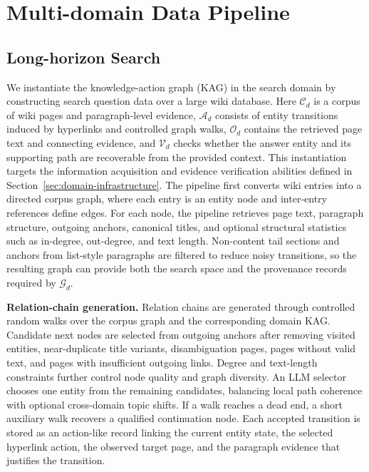 \documentclass{llmxive}
\begin{document}
\section{Multi-domain Data Pipeline}
\subsection{Long-horizon Search}
\label{sec:search_data}
We instantiate the knowledge-action graph (KAG) in the search domain by constructing search question data over a large wiki database. Here $\mathcal{C}_d$ is a corpus of wiki pages and paragraph-level evidence, $\mathcal{A}_d$ consists of entity transitions induced by hyperlinks and controlled graph walks, $\mathcal{O}_d$ contains the retrieved page text and connecting evidence, and $\mathcal{V}_d$ checks whether the answer entity and its supporting path are recoverable from the provided context. This instantiation targets the information acquisition and evidence verification abilities defined in Section~\ref{sec:domain-infrastructure}. The pipeline first converts wiki entries into a directed corpus graph, where each entry is an entity node and inter-entry references define edges. For each node, the pipeline retrieves page text, paragraph structure, outgoing anchors, canonical titles, and optional structural statistics such as in-degree, out-degree, and text length. Non-content tail sections and anchors from list-style paragraphs are filtered to reduce noisy transitions, so the resulting graph can provide both the search space and the provenance records required by $\mathcal{G}_d$.

\textbf{Relation-chain generation.} Relation chains are generated through controlled random walks over the corpus graph and the corresponding domain KAG. Candidate next nodes are selected from outgoing anchors after removing visited entities, near-duplicate title variants, disambiguation pages, pages without valid text, and pages with insufficient outgoing links. Degree and text-length constraints further control node quality and graph diversity. An LLM selector chooses one entity from the remaining candidates, balancing local path coherence with optional cross-domain topic shifts. If a walk reaches a dead end, a short auxiliary walk recovers a qualified continuation node. Each accepted transition is stored as an action-like record linking the current entity state, the selected hyperlink action, the observed target page, and the paragraph evidence that justifies the transition.
\end{document}
